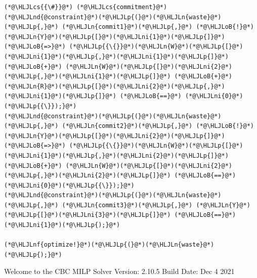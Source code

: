 \documentclass[12pt,a4paper]{article}
\newcommand{\HLJLn}[1]{#1}
\newcommand{\HLJLnd}[1]{\textcolor[RGB]{214,102,97}{#1}}
\newcommand{\HLJLnf}[1]{\textcolor[RGB]{66,102,213}{#1}}
\newcommand{\HLJLni}[1]{\textcolor[RGB]{59,151,46}{#1}}
\newcommand{\HLJLoB}[1]{\textcolor[RGB]{102,102,102}{\textbf{#1}}}
\newcommand{\HLJLp}[1]{#1}
\newcommand{\HLJLcs}[1]{\textcolor[RGB]{153,153,119}{\textit{#1}}}
\begin{document}
\begin{lstlisting}
(*@\HLJLcs{{\#}}@*) (*@\HLJLcs{commitment}@*)
(*@\HLJLnd{@constraint}@*)(*@\HLJLp{(}@*)(*@\HLJLn{waste}@*)(*@\HLJLp{,}@*) (*@\HLJLn{commit1}@*)(*@\HLJLp{,}@*) (*@\HLJLoB{!}@*)(*@\HLJLn{Y}@*)(*@\HLJLp{[}@*)(*@\HLJLni{1}@*)(*@\HLJLp{]}@*) (*@\HLJLoB{=>}@*) (*@\HLJLp{{\{}}@*)(*@\HLJLn{W}@*)(*@\HLJLp{[}@*)(*@\HLJLni{1}@*)(*@\HLJLp{,}@*)(*@\HLJLni{1}@*)(*@\HLJLp{]}@*) (*@\HLJLoB{+}@*) (*@\HLJLn{W}@*)(*@\HLJLp{[}@*)(*@\HLJLni{2}@*)(*@\HLJLp{,}@*)(*@\HLJLni{1}@*)(*@\HLJLp{]}@*) (*@\HLJLoB{+}@*) (*@\HLJLn{R}@*)(*@\HLJLp{[}@*)(*@\HLJLni{2}@*)(*@\HLJLp{,}@*)(*@\HLJLni{1}@*)(*@\HLJLp{]}@*) (*@\HLJLoB{==}@*) (*@\HLJLni{0}@*)(*@\HLJLp{{\}});}@*)
(*@\HLJLnd{@constraint}@*)(*@\HLJLp{(}@*)(*@\HLJLn{waste}@*)(*@\HLJLp{,}@*) (*@\HLJLn{commit2}@*)(*@\HLJLp{,}@*) (*@\HLJLoB{!}@*)(*@\HLJLn{Y}@*)(*@\HLJLp{[}@*)(*@\HLJLni{2}@*)(*@\HLJLp{]}@*) (*@\HLJLoB{=>}@*) (*@\HLJLp{{\{}}@*)(*@\HLJLn{W}@*)(*@\HLJLp{[}@*)(*@\HLJLni{1}@*)(*@\HLJLp{,}@*)(*@\HLJLni{2}@*)(*@\HLJLp{]}@*) (*@\HLJLoB{+}@*) (*@\HLJLn{W}@*)(*@\HLJLp{[}@*)(*@\HLJLni{2}@*)(*@\HLJLp{,}@*)(*@\HLJLni{2}@*)(*@\HLJLp{]}@*) (*@\HLJLoB{==}@*) (*@\HLJLni{0}@*)(*@\HLJLp{{\}});}@*)
(*@\HLJLnd{@constraint}@*)(*@\HLJLp{(}@*)(*@\HLJLn{waste}@*)(*@\HLJLp{,}@*) (*@\HLJLn{commit3}@*)(*@\HLJLp{,}@*) (*@\HLJLn{Y}@*)(*@\HLJLp{[}@*)(*@\HLJLni{3}@*)(*@\HLJLp{]}@*) (*@\HLJLoB{==}@*) (*@\HLJLni{1}@*)(*@\HLJLp{);}@*)

(*@\HLJLnf{optimize!}@*)(*@\HLJLp{(}@*)(*@\HLJLn{waste}@*)(*@\HLJLp{);}@*)
\end{lstlisting}

Welcome to the CBC MILP Solver 
Version: 2.10.5 
Build Date: Dec  4 2021 
\end{document}
